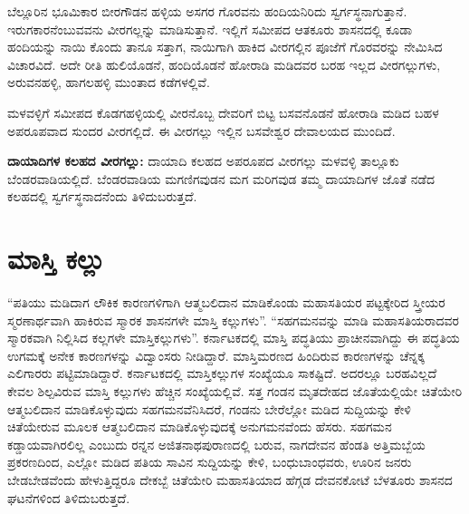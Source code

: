 ಬೆಲ್ಲೂರಿನ ಭೂಮಿಕಾರ ಬೀರಗೌಡನ ಹಳ್ಳಿಯ ಅಸಗರ ಗೊರವನು ಹಂದಿಯನಿರಿದು ಸ್ವರ್ಗಸ್ಥನಾಗುತ್ತಾನೆ. ಇರುಗಕಾರನೆಂಬು\-ವವನು ವೀರಗಲ್ಲನ್ನು ಮಾಡಿಸುತ್ತಾನೆ. ಇಲ್ಲಿಗೆ ಸಮೀಪದ ಆತಕೂರು ಶಾಸನದಲ್ಲಿ ಕೂಡಾ ಹಂದಿಯನ್ನು ನಾಯಿ ಕೊಂದು ತಾನೂ ಸತ್ತಾಗ, ನಾಯಿಗಾಗಿ ಹಾಕಿದ ವೀರಗಲ್ಲಿನ ಪೂಜೆಗೆ ಗೊರವರನ್ನು ನೇಮಿಸಿದ ವಿಚಾರವಿದೆ. ಅದೇ ರೀತಿ ಹುಲಿಯೊಡನೆ, ಹಂದಿಯೊಡನೆ ಹೋರಾಡಿ ಮಡಿದವರ ಬರಹ ಇಲ್ಲದ ವೀರಗಲ್ಲುಗಳು, ಅರುವನಹಳ್ಳಿ, ಹಾಗಲಹಳ್ಳಿ ಮುಂತಾದ ಕಡೆಗಳಲ್ಲಿವೆ.

ಮಳವಳ್ಳಿಗೆ ಸಮೀಪದ ಕೊಡಗಹಳ್ಳಿಯಲ್ಲಿ ವೀರನೊಬ್ಬ ದೇವರಿಗೆ ಬಿಟ್ಟ ಬಸವನೊಡನೆ ಹೋರಾಡಿ ಮಡಿದ ಬಹಳ ಅಪರೂಪವಾದ ಸುಂದರ ವೀರಗಲ್ಲಿದೆ. ಈ ವೀರಗಲ್ಲು ಇಲ್ಲಿನ ಬಸವೇಶ್ವರ ದೇವಾಲಯದ ಮುಂದಿದೆ.

\textbf{ದಾಯಾದಿಗಳ ಕಲಹದ ವೀರಗಲ್ಲು:} ದಾಯಾದಿ ಕಲಹದ ಅಪರೂಪದ ವೀರಗಲ್ಲು ಮಳವಳ್ಳಿ ತಾಲ್ಲೂಕು ಬೆಂಡರವಾಡಿಯಲ್ಲಿದೆ. ಬೆಂಡರವಾಡಿಯ ಮಗಣಿಗವುಡನ ಮಗ ಮರಿಗವುಡ ತಮ್ಮ ದಾಯಾದಿಗಳ ಜೊತೆ ನಡೆದ ಕಲಹದಲ್ಲಿ ಸ್ವರ್ಗಸ್ಥನಾದನೆಂದು ತಿಳಿದುಬರುತ್ತದೆ.


\section*{ಮಾಸ್ತಿ ಕಲ್ಲು}

“ಪತಿಯು ಮಡಿದಾಗ ಲೌಕಿಕ ಕಾರಣಗಳಿಗಾಗಿ ಆತ್ಮಬಲಿದಾನ ಮಾಡಿಕೊಂಡು ಮಹಾಸತಿಯರ ಪಟ್ಟಕ್ಕೇರಿದ ಸ್ತ್ರೀಯರ ಸ್ಮರಣಾರ್ಥವಾಗಿ ಹಾಕಿರುವ ಸ್ಮಾರಕ ಶಾಸನಗಳೇ ಮಾಸ್ತಿ ಕಲ್ಲುಗಳು”. “ಸಹಗಮನವನ್ನು ಮಾಡಿ ಮಹಾಸತಿಯರಾದವರ ಸ್ಮಾರಕವಾಗಿ ನಿಲ್ಲಿಸಿದ ಕಲ್ಲಗಳೇ ಮಾಸ್ತಿಕಲ್ಲುಗಳು”. ಕರ್ನಾಟಕದಲ್ಲಿ ಮಾಸ್ತಿ ಪದ್ಧತಿಯು ಪ್ರಾಚೀನವಾಗಿದ್ದು ಈ ಪದ್ಧತಿಯ ಉಗಮಕ್ಕೆ ಅನೇಕ ಕಾರಣಗಳನ್ನು ವಿದ್ವಾಂಸರು ನೀಡಿದ್ದಾರೆ. ಮಾಸ್ತಿಮರಣದ ಹಿಂದಿರುವ ಕಾರಣಗಳನ್ನು ಚೆನ್ನಕ್ಕ ಎಲಿಗಾರರು ಪಟ್ಟಿಮಾಡಿದ್ದಾರೆ. ಕರ್ನಾಟಕದಲ್ಲಿ ಮಾಸ್ತಿಕಲ್ಲುಗಳ ಸಂಖ್ಯೆಯೂ ಸಾಕಷ್ಟಿದೆ. ಅದರಲ್ಲೂ ಬರಹವಿಲ್ಲದೆ ಕೇವಲ ಶಿಲ್ಪವಿರುವ ಮಾಸ್ತಿ ಕಲ್ಲುಗಳು ಹೆಚ್ಚಿನ ಸಂಖ್ಯೆಯಲ್ಲಿವೆ. ಸತ್ತ ಗಂಡನ ಮೃತದೇಹದ ಜೊತೆಯಲ್ಲಿಯೇ ಚಿತೆಯೇರಿ ಆತ್ಮಬಲಿದಾನ ಮಾಡಿಕೊಳ್ಳುವುದು ಸಹಗಮನವೆನಿಸಿದರೆ, ಗಂಡನು ಬೇರೆಲ್ಲೋ ಮಡಿದ ಸುದ್ದಿಯನ್ನು ಕೇಳಿ ಚಿತೆಯೇರುವ ಮೂಲಕ ಆತ್ಮಬಲಿದಾನ ಮಾಡಿಕೊಳ್ಳುವುದಕ್ಕೆ ಅನುಗಮನವೆಂದು ಹೆಸರು. ಸಹಗಮನ ಕಡ್ಡಾಯವಾಗಿರಲಿಲ್ಲ ಎಂಬುದು ರನ್ನನ ಅಜಿತನಾಥಪುರಾಣದಲ್ಲಿ ಬರುವ, ನಾಗದೇವನ ಹೆಂಡತಿ ಅತ್ತಿಮಬ್ಬೆಯ ಪ್ರಕರಣದಿಂದ, ಎಲ್ಲೋ ಮಡಿದ ಪತಿಯ ಸಾವಿನ ಸುದ್ದಿಯನ್ನು ಕೇಳಿ, ಬಂಧುಬಾಂಧವರು, ಊರಿನ ಜನರು ಬೇಡಬೇಡವೆಂದು ಹೇಳುತ್ತಿದ್ದರೂ ದೇಕಬ್ಬೆ ಚಿತೆಯೇರಿ ಮಹಾಸತಿಯಾದ ಹೆಗ್ಗಡ ದೇವನಕೋಟೆ ಬೆಳತೂರು ಶಾಸನದ ಘಟನೆಗಳಿಂದ ತಿಳಿದುಬರುತ್ತದೆ.

